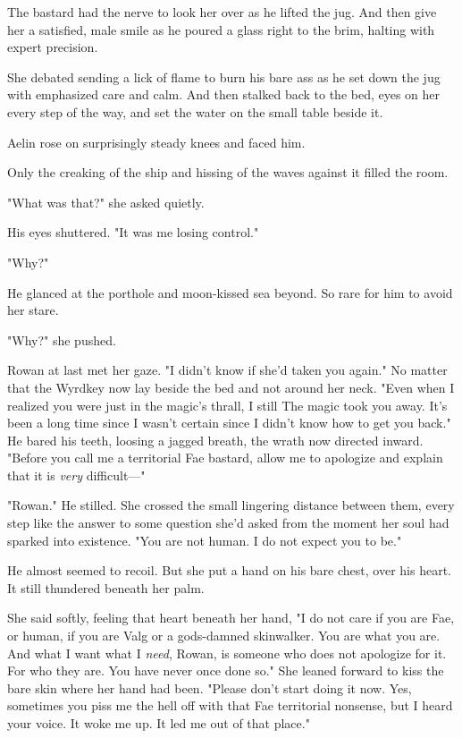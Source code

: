 The bastard had the nerve to look her over as he lifted the jug. And then give her a satisfied, male smile as he poured a glass right to the brim, halting with expert precision.

She debated sending a lick of flame to burn his bare ass as he set down the jug with emphasized care and calm. And then stalked back to the bed, eyes on her every step of the way, and set the water on the small table beside it.

Aelin rose on surprisingly steady knees and faced him.

Only the creaking of the ship and hissing of the waves against it filled the room.

"What was that?" she asked quietly.

His eyes shuttered. "It was  me losing control."

"Why?"

He glanced at the porthole and moon-kissed sea beyond. So rare for him to avoid her stare.

"Why?" she pushed.

Rowan at last met her gaze. "I didn't know if she'd taken you again." No matter that the Wyrdkey now lay beside the bed and not around her neck. "Even when I realized you were just in the magic's thrall, I still  The magic took you away. It's been a long time since I wasn't certain  since I didn't know how to get you back." He bared his teeth, loosing a jagged breath, the wrath now directed inward. "Before you call me a territorial Fae bastard, allow me to apologize and explain that it is \emph{very} difficult---"

"Rowan." He stilled. She crossed the small lingering distance between them, every step like the answer to some question she'd asked from the moment her soul had sparked into existence. "You are not human. I do not expect you to be."

He almost seemed to recoil. But she put a hand on his bare chest, over his heart. It still thundered beneath her palm.

She said softly, feeling that heart beneath her hand, "I do not care if you are Fae, or human, if you are Valg or a gods-damned skinwalker. You are what you are. And what I want  what I \emph{need}, Rowan, is someone who does not apologize for it. For who they are. You have never once done so." She leaned forward to kiss the bare skin where her hand had been. "Please don't start doing it now. Yes, sometimes you piss me the hell off with that Fae territorial nonsense, but  I heard your voice. It woke me up. It led me out of that  place."

